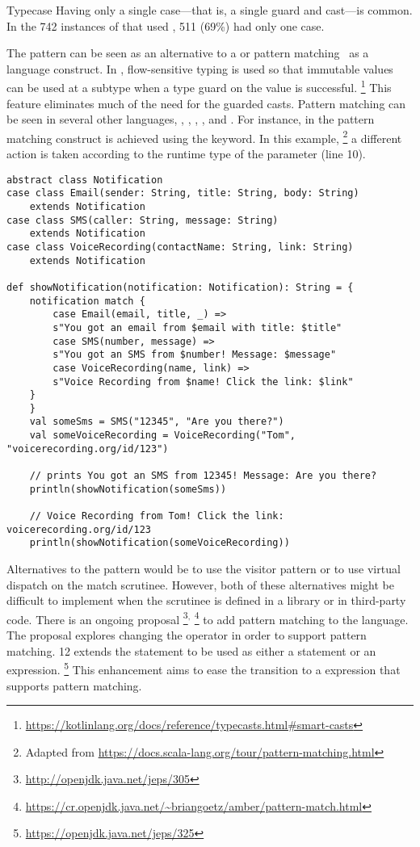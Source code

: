 \begin{pattern}{Typecase}
\discussion{}
Having only a single case---that is, a single guard and cast---is common.
In the 742 instances of \thisp{} that used , 511
(69\%) had only one case.

The \thisp{} pattern can be seen as an \adhoc{} alternative to a
 or pattern matching~\citep{milnerProposalStandardML1984} as a
language construct.
In \kotlin{}, flow-sensitive typing is used so that immutable values can be
used at a subtype when a type guard on the value is successful.%
\footnote{\url{https://kotlinlang.org/docs/reference/typecasts.html\#smart-casts}}
This feature eliminates much of the need for the guarded casts.
Pattern matching can be seen in several other languages, \eg, \ml{}, \scala{}, \csharp{}, and \haskell{}.
For instance, in \scala{} the pattern matching construct is achieved using the  keyword.
In this example,%
\footnote{Adapted from \url{https://docs.scala-lang.org/tour/pattern-matching.html}}
a different action is taken according to the runtime type of the parameter  (line 10).

\begin{verbatim}
abstract class Notification
case class Email(sender: String, title: String, body: String)
	extends Notification
case class SMS(caller: String, message: String)
	extends Notification
case class VoiceRecording(contactName: String, link: String)
	extends Notification

def showNotification(notification: Notification): String = {
	notification match {
		case Email(email, title, _) =>
		s"You got an email from $email with title: $title"
		case SMS(number, message) =>
		s"You got an SMS from $number! Message: $message"
		case VoiceRecording(name, link) =>
		s"Voice Recording from $name! Click the link: $link"
	}
	}
	val someSms = SMS("12345", "Are you there?")
	val someVoiceRecording = VoiceRecording("Tom", "voicerecording.org/id/123")
	
	// prints You got an SMS from 12345! Message: Are you there?
	println(showNotification(someSms))
	
	// Voice Recording from Tom! Click the link: voicerecording.org/id/123	
	println(showNotification(someVoiceRecording))
\end{verbatim}

Alternatives to the \thisp{} pattern would be to use the visitor pattern or to
use virtual dispatch on the match scrutinee.
However, both of these
alternatives might be difficult to implement when the scrutinee is defined in
a library or in third-party code.
There is an ongoing proposal%
\footnote{\url{http://openjdk.java.net/jeps/305}}$^{,}$%
\footnote{\url{https://cr.openjdk.java.net/~briangoetz/amber/pattern-match.html}}
to add pattern matching to the \java{} language.
The proposal explores changing the  operator in order to support pattern matching.
\java{} 12 extends the  statement to be used as either a statement or an expression.%
\footnote{\url{https://openjdk.java.net/jeps/325}}
This enhancement aims to ease the transition to a  expression that supports pattern matching.


\end{pattern}
